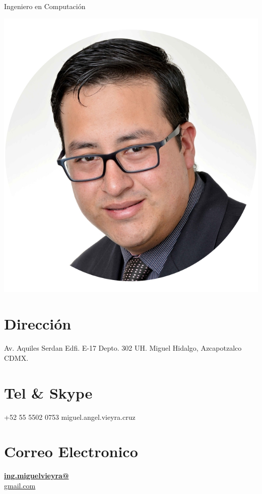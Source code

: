 \documentclass[]{friggeri-cv}
\begin{document}
\vspace{3mm}
      {Ingeniero en Computación}
      

\begin{aside}
  \includegraphics[scale=0.18]{img/cv.png}
  \section{Dirección}
    Av. Aquiles Serdan Edfi. E-17 Depto. 302
    UH. Miguel Hidalgo, Azcapotzalco CDMX.
    ~
  \section{Tel \& Skype}
    +52 55 5502 0753
    miguel.angel.vieyra.cruz
    ~
  \section{Correo Electronico}
    \href{mailto:ing.miguelvieyra@gmail.com}{\textbf{ing.miguelvieyra@}\\gmail.com}
    ~

\end{aside}
\end{document}
